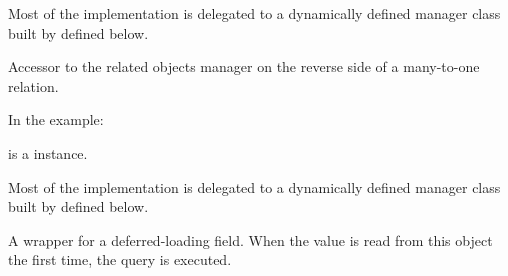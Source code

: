 \documentclass[letterpaper,10pt,english]{sphinxmanual}
\begin{document}
\begin{fulllineitems}
\begin{fulllineitems}
Most of the implementation is delegated to a dynamically defined manager
class built by  defined below.

\end{fulllineitems}


\begin{fulllineitems}
\label{\detokenize{QuChemPedIA.models:QuChemPedIA.models.VersionModel.SoftwareVersion.importrule_set}}
Accessor to the related objects manager on the reverse side of a
many-to-one relation.

In the example:

%
\begin{sphinxVerbatim}[commandchars=\\\{\}]
 
       
\end{sphinxVerbatim}

 is a  instance.

Most of the implementation is delegated to a dynamically defined manager
class built by  defined below.

\end{fulllineitems}


\begin{fulllineitems}
\label{\detokenize{QuChemPedIA.models:QuChemPedIA.models.VersionModel.SoftwareVersion.objects}}
\end{fulllineitems}


\begin{fulllineitems}
\label{\detokenize{QuChemPedIA.models:QuChemPedIA.models.VersionModel.SoftwareVersion.version_number}}
A wrapper for a deferred-loading field. When the value is read from this
object the first time, the query is executed.

\end{fulllineitems}


\end{fulllineitems}
\end{document}

